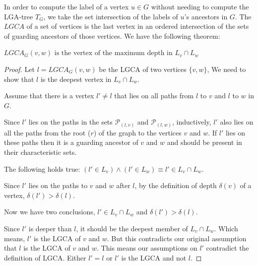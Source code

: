 In order to compute the label of a vertex $u \in G$ without needing to compute the LGA-tree $T_G$, we take the set intersection of the labels of $u$'s ancestors in $G$.
The $LGCA$ of a set of vertices is the last vertex in an ordered intersection of the sets of guarding ancestors of those vertices. We have the following theorem:

\begin{theorem} \label{proofOfDeepness}
	$LGCA_G(v,w) \text{ is the vertex of the maximum depth in } L_v\cap L_w$
\end{theorem}

\begin{proof}
	 Let $l = LGCA_G(v,w)$ be the LGCA of two vertices $\{v, w\}$, We need to show that $l$ is the deepest vertex in  $L_v \cap L_w$.

	Assume that there is a vertex $l' \neq l$ that lies on all paths from $l$ to $v$ and $l$ to $w$ in $G$.

	Since $l'$ lies on the paths in the sets $\mathcal{P}_{(l,v)}$ and $\mathcal{P}_{(l,w)}$, inductively, $l'$ also lies on all the paths from the root ($r$) of the graph to the vertices $v$ and $w$.
	If  $l'$ lies on these paths then it is a guarding ancestor of $v$ and $w$ and should be present in their characteristic sets.
	
	The following holds true: $(l' \in L_v) \land (l' \in L_w) \equiv l' \in L_v \cap L_w$.

	Since $l'$ lies on the paths to $v$ and $w$ after $l$, by the definition of depth $\delta(v)$ of a vertex,	$\delta(l') > \delta(l)$.

	Now we have two conclusions, $l' \in L_v \cap L_w$ and $\delta(l') > \delta(l)$.

	Since $l'$ is deeper than $l$, it should be the deepest member of  $ L_v \cap L_w$.
	Which means, $l'$ is the LGCA of $v$ and $w$.
	But this contradicts our original assumption that $l$ is the LGCA of $v$ and $w$.
	This means our assumptions on $l'$ contradict the definition of LGCA. Either $l'=l$ or $l'$ is the LGCA and not $l$.
\end{proof}


